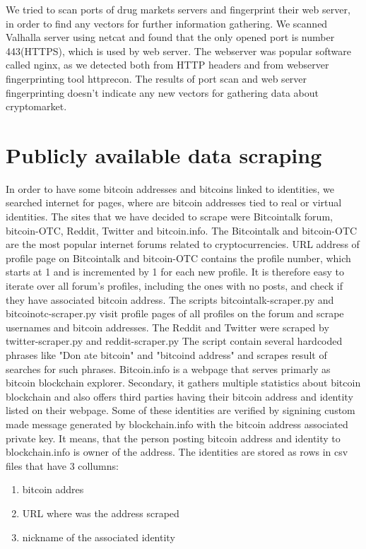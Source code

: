 \documentclass[
  digital, %
  table,   %
  lof,     %
  lot,     %
  oneside
]{fithesis3}
\begin{document}
We tried to scan ports of drug markets servers and fingerprint their web server,
in order to find any vectors for further information gathering.
We scanned Valhalla server using netcat and found that the only opened port is number 443(HTTPS),
which is used by web server. The webserver was popular software called nginx, as we detected
both from HTTP headers and from webserver fingerprinting tool httprecon.
The results of port scan and web server fingerprinting doesn't indicate
any new vectors for gathering data about cryptomarket.

\section{Publicly available data scraping}
\label{Publicly available data scraping}

In order to have some bitcoin addresses and bitcoins linked to identities,
we searched internet for pages, where are bitcoin addresses tied to real or virtual identities.
The sites that we have decided to scrape were Bitcointalk forum, bitcoin-OTC, Reddit,
Twitter and bitcoin.info.
The Bitcointalk and bitcoin-OTC are the most popular internet forums
related to cryptocurrencies. URL address of profile page on Bitcointalk
and bitcoin-OTC contains the profile number, which starts at 1 and is  incremented by 1
for each new profile. 
It is therefore easy to iterate over all forum's profiles,
including the ones with no posts, and check if they have associated bitcoin address.
The scripts bitcointalk-scraper.py and bitcoinotc-scraper.py
visit profile pages of all profiles on the forum and scrape usernames and bitcoin addresses. 
The Reddit and Twitter were scraped by twitter-scraper.py and reddit-scraper.py
The script contain several hardcoded phrases like "Don
ate bitcoin" and "bitcoind address" and scrapes 
result of searches for such phrases.
Bitcoin.info is a webpage that serves primarly as bitcoin blockchain explorer. Secondary,
it gathers multiple statistics about bitcoin blockchain and also offers
third parties having their bitcoin address and identity listed on their webpage.
Some of these identities are verified by signining
custom made message generated by blockchain.info
with the bitcoin address associated private key. It means, that the person
posting bitcoin address and identity to blockchain.info is owner of the address.
The identities are stored as rows in csv files that have 3 collumns:

\begin{enumerate}
 \item bitcoin addres
 \item URL where was the address scraped
 \item nickname of the associated identity
\end{enumerate}
\end{document}
